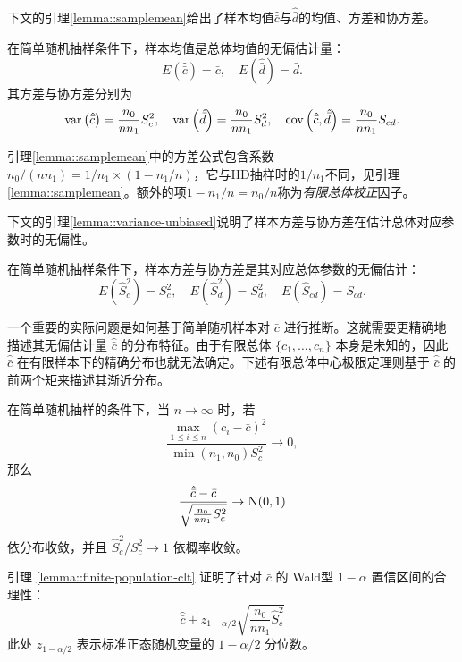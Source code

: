 下文的引理\ref{lemma::samplemean}给出了样本均值$ \hat{\bar{c}} $与$ \hat{\bar{d}}  $的均值、方差和协方差。

\begin{lemma}
\label{lemma::samplemean}
在简单随机抽样条件下，样本均值是总体均值的无偏估计量：
$$
E( \hat{\bar{c}} ) =  \bar{c} ,\quad
E( \hat{\bar{d}}  ) =  \bar{d}  .
$$
其方差与协方差分别为
\begin{eqnarray*}
\textup{var}\left(   \hat{\bar{c}} \right) = \frac{ n_0}{n n_1  }  S_c^2 ,\quad 
\textup{var}\left(   \hat{\bar{d}}  \right) = \frac{ n_0}{n n_1  }  S_d^2, \quad 
\textup{cov}\left(  \hat{\bar{c}}  ,   \hat{\bar{d}}  \right) = \frac{ n_0}{n n_1 } S_{cd}. 
\end{eqnarray*}
\end{lemma}

引理\ref{lemma::samplemean}中的方差公式包含系数$  n_0 / (n n_1 )  = 1/n_1 \times (1-n_1/n)$，它与IID抽样时的$1/n_1$不同，见引理\ref{lemma::samplemean}。额外的项$1-n_1/n = n_0/n$称为{\it 有限总体校正}因子。 


下文的引理\ref{lemma::variance-unbiased}说明了样本方差与协方差在估计总体对应参数时的无偏性。 
 
\begin{lemma}\label{lemma::variance-unbiased}
在简单随机抽样条件下，样本方差与协方差是其对应总体参数的无偏估计：
$$
E( \hat{S}_c^2  ) = S_c^2,\quad 
E( \hat{S}_d^2  ) = S_d^2,\quad
E( \hat{S}_{cd} ) = S_{cd}  .
$$
\end{lemma}


一个重要的实际问题是如何基于简单随机样本对 $ \bar{c} $ 进行推断。这就需要更精确地描述其无偏估计量 $ \hat{\bar{c}} $ 的分布特征。由于有限总体 $\{  c_1, \ldots, c_n \}$ 本身是未知的，因此 $ \hat{\bar{c}} $ 在有限样本下的精确分布也就无法确定。下述有限总体中心极限定理则基于 $ \hat{\bar{c}} $ 的前两个矩来描述其渐近分布。 

\begin{lemma}[有限总体中心极限定理]
\label{lemma::finite-population-clt}
在简单随机抽样的条件下，当 $n\rightarrow \infty$ 时，若
$$
  \frac{ \max_{1\leq i \leq n}  (c_i -  \bar{c}  )^2 }{ \min(n_1, n_0)  S_c^2  } \rightarrow 0,
$$
那么
$$
\frac{  \hat{\bar{c}}  -  \bar{c}  }{   \sqrt{  \frac{ n_0}{n n_1  }  S_c^2}    } \rightarrow \textsc{N}(0,1)
$$
依分布收敛，并且
$
 \hat{S}_c^2   / S_c^2   \rightarrow 1
$
依概率收敛。 
\end{lemma}

引理 \ref{lemma::finite-population-clt} 证明了针对 $ \bar{c} $ 的 Wald型 $1-\alpha$ 置信区间的合理性：
$$
 \hat{\bar{c}}  \pm z_{1-\alpha/2}  \sqrt{  \frac{ n_0}{n n_1  }   \hat{S}_c^2  } 
$$
此处 $z_{1-\alpha/2} $ 表示标准正态随机变量的 $1-\alpha/2$ 分位数。 

